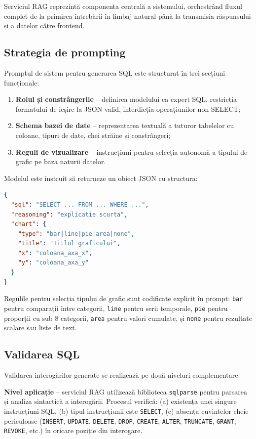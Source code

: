\documentclass[12pt, a4paper]{report}
\newcommand{\code}[1]{\texttt{#1}}
\begin{document}
Serviciul RAG reprezintă componenta centrală a sistemului, orchestrând fluxul complet de la primirea întrebării în limbaj natural până la transmisia răspunsului și a datelor către frontend.

\subsection{Strategia de prompting}

Promptul de sistem pentru generarea SQL este structurat în trei secțiuni funcționale:

\begin{enumerate}[nosep]
  \item \textbf{Rolul și constrângerile} -- definirea modelului ca expert SQL, restricția formatului de ieșire la JSON valid, interdicția operațiunilor non-SELECT;
  \item \textbf{Schema bazei de date} -- reprezentarea textuală a tuturor tabelelor cu coloane, tipuri de date, chei străine și constrângeri;
  \item \textbf{Reguli de vizualizare} -- instrucțiuni pentru selecția autonomă a tipului de grafic pe baza naturii datelor.
\end{enumerate}

Modelul este instruit să returneze un obiect JSON cu structura:

\begin{lstlisting}[language=JSON, caption={Formatul răspunsului de generare SQL}]
{
  "sql": "SELECT ... FROM ... WHERE ...",
  "reasoning": "explicatie scurta",
  "chart": {
    "type": "bar|line|pie|area|none",
    "title": "Titlul graficului",
    "x": "coloana_axa_x",
    "y": "coloana_axa_y"
  }
}
\end{lstlisting}

Regulile pentru selecția tipului de grafic sunt codificate explicit în prompt: \code{bar} pentru comparații între categorii, \code{line} pentru serii temporale, \code{pie} pentru proporții cu sub 8 categorii, \code{area} pentru valori cumulate, și \code{none} pentru rezultate scalare sau liste de text.

\subsection{Validarea SQL}

Validarea interogărilor generate se realizează pe două niveluri complementare:

\textbf{Nivel aplicație} -- serviciul RAG utilizează biblioteca \code{sqlparse} pentru parsarea și analiza sintactică a interogării. Procesul verifică: (a) existența unei singure instrucțiuni SQL, (b) tipul instrucțiunii este \code{SELECT}, (c) absența cuvintelor cheie periculoase (\code{INSERT}, \code{UPDATE}, \code{DELETE}, \code{DROP}, \code{CREATE}, \code{ALTER}, \code{TRUNCATE}, \code{GRANT}, \code{REVOKE}, etc.) în oricare poziție din interogare.
\end{document}
